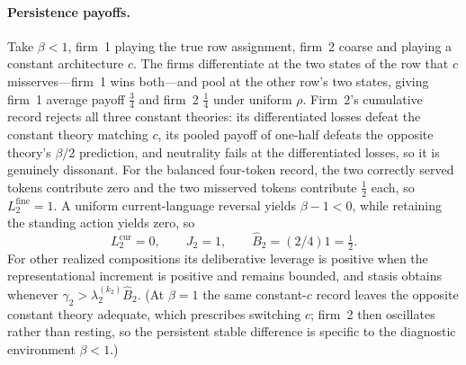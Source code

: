 \documentclass[11pt]{article}
\theoremstyle{definition}
\begin{document}
\paragraph{Persistence payoffs.}
Take $\beta<1$, firm~1 playing the true row assignment, firm~2 coarse and playing a constant architecture $c$.
The firms differentiate at the two states of the row that $c$ misserves---firm~1 wins both---and pool at the other row's two states, giving firm~1 average payoff $\tfrac34$ and firm~2 $\tfrac14$ under uniform $\rho$.
Firm~2's cumulative record rejects all three constant theories: its differentiated losses defeat the constant theory matching $c$, its pooled payoff of one-half defeats the opposite theory's $\beta/2$ prediction, and neutrality fails at the differentiated losses, so it is genuinely dissonant.
For the balanced four-token record, the two correctly served tokens contribute zero and the two misserved tokens contribute $\tfrac12$ each, so $L_2^{\mathrm{fine}}=1$.
A uniform current-language reversal yields $\beta-1<0$, while retaining the standing action yields zero, so
\[
L_2^{\mathrm{cur}}=0,\qquad
J_2=1,\qquad
\widehat B_2=(2/4)1=\tfrac12.
\]
For other realized compositions its deliberative leverage is positive when the representational increment is positive and remains bounded, and stasis obtains whenever $\gamma_2>\lambda_2^{(k_2)}\widehat B_2$.
(At $\beta=1$ the same constant-$c$ record leaves the opposite constant theory adequate, which prescribes switching $c$; firm~2 then oscillates rather than resting, so the persistent stable difference is specific to the diagnostic environment $\beta<1$.)
\end{document}
